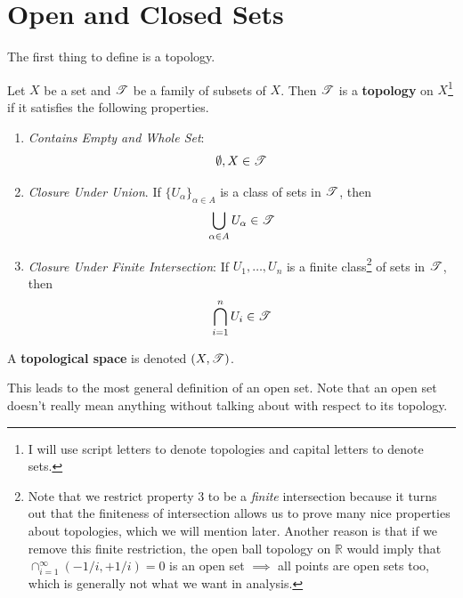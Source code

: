 \section{Open and Closed Sets} 

  The first thing to define is a topology. 

  \begin{definition}[Topology]
    Let $X$ be a set and $\operatorname{\mathscr{T}}$ be a family of subsets of $X$. Then $\operatorname{\mathscr{T}}$ is a \textbf{topology} on $X$\footnote{I will use script letters to denote topologies and capital letters to denote sets.} if it satisfies the following properties. 
    \begin{enumerate}
      \item \textit{Contains Empty and Whole Set}: 
      \begin{equation}
        \emptyset, X \in \operatorname{\mathscr{T}}
      \end{equation}

      \item \textit{Closure Under Union}. If $\{U_\alpha\}_{\alpha \in A}$ is a class of sets in $\operatorname{\mathscr{T}}$, then 
      \begin{equation}
        \bigcup_{\alpha \in A} U_\alpha \in \operatorname{\mathscr{T}}
      \end{equation}

      \item \textit{Closure Under Finite Intersection}: If $U_1, \ldots, U_n$ is a finite class\footnote{Note that we restrict property 3 to be a \textit{finite} intersection because it turns out that the finiteness of intersection allows us to prove many nice properties about topologies, which we will mention later. Another reason is that if we remove this finite restriction, the open ball topology on $\mathbb{R}$ would imply that $\cap_{i = 1}^{\infty} ( - 1/i, +1/i ) = 0$ is an open set $\implies$ all points are open sets too, which is generally not what we want in analysis. 
      } of sets in $\operatorname{\mathscr{T}}$, then 
      \begin{equation}
       \bigcap_{i=1}^{n} U_i \in \operatorname{\mathscr{T}}
      \end{equation}
    \end{enumerate}
    A \textbf{topological space} is denoted $(X, \operatorname{\mathscr{T}})$. 
  \end{definition}

  This leads to the most general definition of an open set. Note that an open set doesn't really mean anything without talking about with respect to its topology. 

